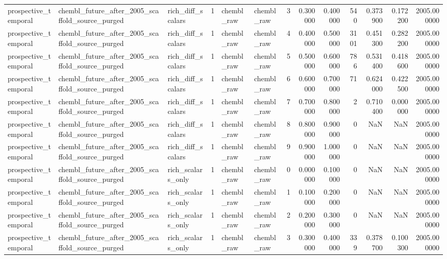 \begin{longtable}{lllrllrrrrrrr}
prospective\_temporal & chembl\_future\_after\_2005\_scaffold\_source\_purged & rich\_diff\_scalars & 1 & chembl\_raw & chembl\_raw & 3 & 0.300000 & 0.400000 & 540 & 0.373900 & 0.172200 & 2005.000000 \\
prospective\_temporal & chembl\_future\_after\_2005\_scaffold\_source\_purged & rich\_diff\_scalars & 1 & chembl\_raw & chembl\_raw & 4 & 0.400000 & 0.500000 & 3101 & 0.451300 & 0.282200 & 2005.000000 \\
prospective\_temporal & chembl\_future\_after\_2005\_scaffold\_source\_purged & rich\_diff\_scalars & 1 & chembl\_raw & chembl\_raw & 5 & 0.500000 & 0.600000 & 786 & 0.531400 & 0.418600 & 2005.000000 \\
prospective\_temporal & chembl\_future\_after\_2005\_scaffold\_source\_purged & rich\_diff\_scalars & 1 & chembl\_raw & chembl\_raw & 6 & 0.600000 & 0.700000 & 71 & 0.624000 & 0.422500 & 2005.000000 \\
prospective\_temporal & chembl\_future\_after\_2005\_scaffold\_source\_purged & rich\_diff\_scalars & 1 & chembl\_raw & chembl\_raw & 7 & 0.700000 & 0.800000 & 2 & 0.710400 & 0.000000 & 2005.000000 \\
prospective\_temporal & chembl\_future\_after\_2005\_scaffold\_source\_purged & rich\_diff\_scalars & 1 & chembl\_raw & chembl\_raw & 8 & 0.800000 & 0.900000 & 0 & NaN & NaN & 2005.000000 \\
prospective\_temporal & chembl\_future\_after\_2005\_scaffold\_source\_purged & rich\_diff\_scalars & 1 & chembl\_raw & chembl\_raw & 9 & 0.900000 & 1.000000 & 0 & NaN & NaN & 2005.000000 \\
prospective\_temporal & chembl\_future\_after\_2005\_scaffold\_source\_purged & rich\_scalars\_only & 1 & chembl\_raw & chembl\_raw & 0 & 0.000000 & 0.100000 & 0 & NaN & NaN & 2005.000000 \\
prospective\_temporal & chembl\_future\_after\_2005\_scaffold\_source\_purged & rich\_scalars\_only & 1 & chembl\_raw & chembl\_raw & 1 & 0.100000 & 0.200000 & 0 & NaN & NaN & 2005.000000 \\
prospective\_temporal & chembl\_future\_after\_2005\_scaffold\_source\_purged & rich\_scalars\_only & 1 & chembl\_raw & chembl\_raw & 2 & 0.200000 & 0.300000 & 0 & NaN & NaN & 2005.000000 \\
prospective\_temporal & chembl\_future\_after\_2005\_scaffold\_source\_purged & rich\_scalars\_only & 1 & chembl\_raw & chembl\_raw & 3 & 0.300000 & 0.400000 & 339 & 0.378700 & 0.100300 & 2005.000000 \\

\end{longtable}
